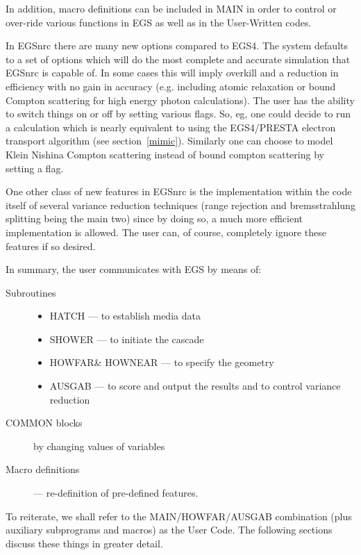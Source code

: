 In addition, macro definitions can be included in MAIN in order to control
or over-ride various functions in EGS as well as in the User-Written
codes.

In EGSnrc there are many new options compared to EGS4.  The system
defaults to a set of options which will do the most complete and accurate
simulation that EGSnrc is capable of. In some cases this will imply
overkill and a reduction in efficiency with no gain in accuracy (e.g.
including atomic relaxation or bound Compton scattering for high energy
photon calculations). The user has the ability to switch things on or off
by setting various  flags.  So, eg, one could decide to run a calculation
which is nearly equivalent to using the EGS4/PRESTA electron transport
algorithm (see section~\ref{mimic}). Similarly one can choose to model
Klein Nishina Compton scattering instead of bound compton scattering by
setting a flag.

One other class of new features in EGSnrc is the implementation within the
code itself of several variance reduction techniques (range rejection and
bremsstrahlung splitting being the main two) since by doing so, a much more
efficient implementation is allowed. The user can, of course, completely
ignore these features if so desired.


      In summary, the user communicates with EGS by means of:
\begin{description}
\item[Subroutines]\mbox{}
\begin{itemize}
\item HATCH  --- to establish media data

\item SHOWER --- to initiate the cascade

\item HOWFAR\& HOWNEAR --- to specify the geometry

\item AUSGAB --- to score and output the results and to control variance
reduction

\end{itemize}

\item[COMMON blocks]  by changing values of variables

\item[Macro definitions] --- re-definition of pre-defined features.
\end{description}

To reiterate, we shall refer to the MAIN/HOWFAR/AUSGAB combination
(plus auxiliary subprograms and macros) as the User Code.  The following
sections discuss these things in greater detail.

